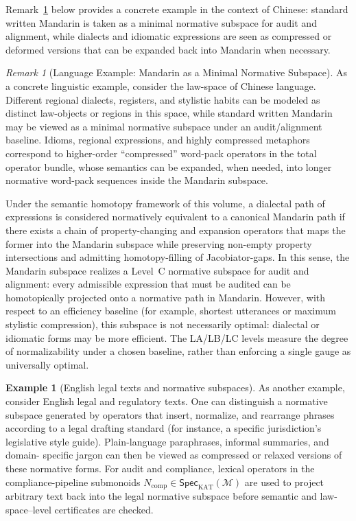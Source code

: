 \documentclass[11pt]{book}
\theoremstyle{plain}
\theoremstyle{definition}
\newtheorem{example}[theorem]{Example}
\theoremstyle{remark}
\newtheorem{remark}[theorem]{Remark}
\begin{document}
Remark~\ref{rem:mandarin-minimal-normative-subspace} below provides a
concrete example in the context of Chinese: standard written Mandarin
is taken as a minimal normative subspace for audit and alignment,
while dialects and idiomatic expressions are seen as compressed or
deformed versions that can be expanded back into Mandarin when
necessary.

\begin{remark}[Language Example: Mandarin as a Minimal Normative Subspace]
\label{rem:mandarin-minimal-normative-subspace}
As a concrete linguistic example, consider the law-space of Chinese language.
Different regional dialects, registers, and stylistic habits can be modeled as
distinct law-objects or regions in this space, while standard written Mandarin
may be viewed as a minimal normative subspace under an audit/alignment
baseline. Idioms, regional expressions, and highly compressed metaphors
correspond to higher-order ``compressed'' word-pack operators in the total
operator bundle, whose semantics can be expanded, when needed, into longer
normative word-pack sequences inside the Mandarin subspace.

Under the semantic homotopy framework of this volume, a dialectal path of
expressions is considered normatively equivalent to a canonical Mandarin path
if there exists a chain of property-changing and expansion operators that maps
the former into the Mandarin subspace while preserving non-empty property
intersections and admitting homotopy-filling of Jacobiator-gaps. In this
sense, the Mandarin subspace realizes a Level~C normative subspace for audit
and alignment: every admissible expression that must be audited can be
homotopically projected onto a normative path in Mandarin. However, with
respect to an efficiency baseline (for example, shortest utterances or
maximum stylistic compression), this subspace is not necessarily optimal:
dialectal or idiomatic forms may be more efficient. The LA/LB/LC levels
measure the degree of normalizability under a chosen baseline, rather than
enforcing a single gauge as universally optimal.
\end{remark}



\begin{example}[English legal texts and normative subspaces]
\label{ex:english-legal-normative-subspace}
As another example, consider English legal and regulatory texts. One
can distinguish a normative subspace generated by operators that
insert, normalize, and rearrange phrases according to a legal drafting
standard (for instance, a specific jurisdiction's legislative style
guide). Plain-language paraphrases, informal summaries, and domain-
specific jargon can then be viewed as compressed or relaxed versions
of these normative forms. For audit and compliance, lexical operators
in the compliance-pipeline submonoids
$N_{\mathrm{comp}}\in\mathsf{Spec}_{\mathrm{KAT}}(\mathcal{M})$ are
used to project arbitrary text back into the legal normative subspace
before semantic and law-space–level certificates are checked.
\end{example}
\end{document}

